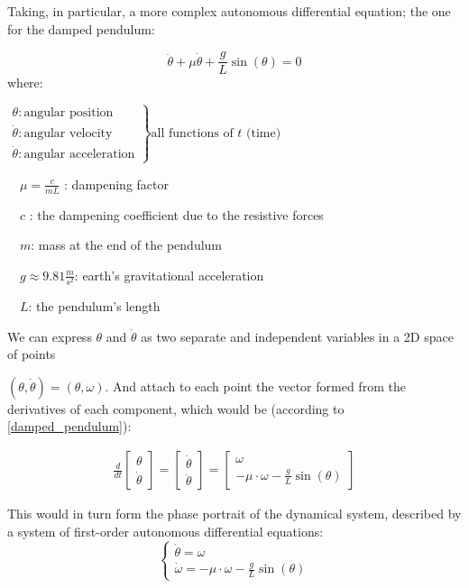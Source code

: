 Taking, in particular, a more complex autonomous differential equation; the one for the damped pendulum:

\begin{equation}\label{damped_pendulum}
	\ddot{\theta} +\mu\dot{\theta} + \frac{g}{L}\sin(\theta) = 0
\end{equation}
where:  \par
$
\left.
\begin{array}{l}
	\theta : \text{angular position}       \\
	\dot{\theta} : \text{angular velocity} \\
	\ddot{\theta} : \text{angular acceleration}
\end{array}
\right\}
\text{all functions of } t \text{ (time)}
$

\ \ $\mu = \frac{c}{mL}$ : dampening factor \par
\ \ $c$ : the dampening coefficient due to the resistive forces \par
\ \ $m$: mass at the end of the pendulum \par
\ \ $g \approx 9.81 \frac{m}{s^2}$: earth's gravitational acceleration \par
\ \ $L$: the pendulum's length \par

We can express $\theta$ and $\dot{\theta}$ as two separate and independent variables in a 2D space of points \par $(\theta,\dot{\theta}) = (\theta,\omega)$.
And attach to each point the vector formed from the derivatives of each component, which would be (according to \ref{damped_pendulum}):

\begin{align}
\frac{d}{dt}
\begin{bmatrix}
	\theta \\
	\dot{\theta}
\end{bmatrix} =
\begin{bmatrix}
	\dot{\theta} \\
	\ddot{\theta}
\end{bmatrix} =
\begin{bmatrix}
	\omega \\
	-\mu \cdot \omega - \frac{g}{L}\sin(\theta)
\end{bmatrix}
\end{align}

This would in turn form the phase portrait of the dynamical system, described by a system of first-order autonomous differential equations:
\[
\begin{cases}
	\dot{\theta}  = \omega \\
	\dot{\omega} = -\mu \cdot \omega - \frac{g}{L}\sin(\theta)
\end{cases}
\]

